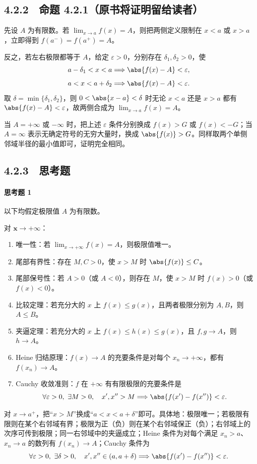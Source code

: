 \subsection*{4.2.2　命题 4.2.1（原书将证明留给读者）}
\begin{xsolution}
先设 $A$ 为有限数。若 $\lim_{x\to a}f(x)=A$，则把两侧定义限制在 $x<a$ 或 $x>a$，立即得到
$f(a^-)=f(a^+)=A$。

反之，若左右极限都等于 $A$，给定 $\varepsilon>0$，分别存在 $\delta_1,\delta_2>0$，使
\[
  a-\delta_1<x<a\Longrightarrow\abs{f(x)-A}<\varepsilon,
\]
\[
  a<x<a+\delta_2\Longrightarrow\abs{f(x)-A}<\varepsilon.
\]
取 $\delta=\min\{\delta_1,\delta_2\}$，则 $0<\abs{x-a}<\delta$ 时无论 $x<a$ 还是 $x>a$ 都有
$\abs{f(x)-A}<\varepsilon$，故两侧合成为 $\lim_{x\to a}f(x)=A$。

当 $A=+\infty$ 或 $-\infty$ 时，把上述 $\varepsilon$ 条件分别换成 $f(x)>G$ 或 $f(x)<-G$；当 $A=\infty$ 表示无确定符号的无穷大量时，换成 $\abs{f(x)}>G$。同样取两个单侧邻域半径的最小值即可，证明完全相同。
\end{xsolution}

\subsection*{4.2.3　思考题}

\paragraph{思考题 1}
\begin{xsolution}
以下均假定极限值 $A$ 为有限数。

对 $\boldsymbol{x\to+\infty}$：
\begin{enumerate}
  \item 唯一性：若 $\lim_{x\to+\infty}f(x)=A$，则极限值唯一。
  \item 尾部有界性：存在 $M,C>0$，使 $x>M$ 时 $\abs{f(x)}\leq C$。
  \item 尾部保号性：若 $A>0$（或 $A<0$），则存在 $M$，使 $x>M$ 时 $f(x)>0$（或 $f(x)<0$）。
  \item 比较定理：若充分大的 $x$ 上 $f(x)\leq g(x)$，且两者极限分别为 $A,B$，则 $A\leq B$。
  \item 夹逼定理：若充分大的 $x$ 上 $f(x)\leq h(x)\leq g(x)$，且 $f,g\to A$，则 $h\to A$。
  \item Heine 归结原理：$f(x)\to A$ 的充要条件是对每个 $x_n\to+\infty$，都有 $f(x_n)\to A$。
  \item Cauchy 收敛准则：$f$ 在 $+\infty$ 有有限极限的充要条件是
  \[
    \forall\varepsilon>0,\ \exists M>0,\quad x',x''>M
    \Longrightarrow\abs{f(x')-f(x'')}<\varepsilon.
  \]
\end{enumerate}

对 $x\to a^+$，把“$x>M$”换成“$a<x<a+\delta$”即可。具体地：极限唯一；若极限有限则在某个右邻域有界；极限为正（负）则在某个右邻域保正（负）；右邻域上的次序可传到极限；同一右邻域中的夹逼成立；Heine 条件为对每个满足 $x_n>a$、$x_n\to a$ 的数列有 $f(x_n)\to A$；Cauchy 条件为
\[
  \forall\varepsilon>0,\ \exists\delta>0,\quad
  x',x''\in(a,a+\delta)
  \Longrightarrow\abs{f(x')-f(x'')}<\varepsilon.
\]
\end{xsolution}

